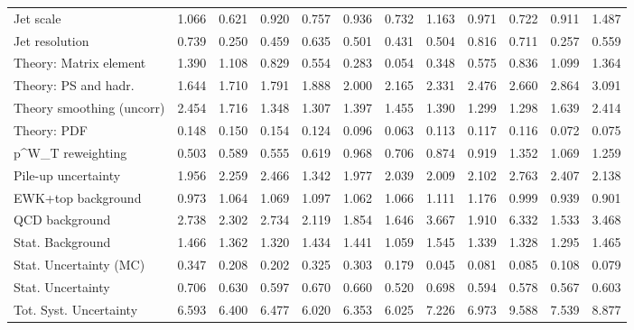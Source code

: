 \begin{tabular}{l|p{0.6cm}p{0.6cm}p{0.6cm}p{0.6cm}p{0.6cm}p{0.6cm}p{0.6cm}p{0.6cm}p{0.6cm}p{0.6cm}p{0.6cm}}
Jet scale                                & 1.066 & 0.621 & 0.920 & 0.757 & 0.936 & 0.732 & 1.163 & 0.971 & 0.722 & 0.911 & 1.487 \\
Jet resolution                           & 0.739 & 0.250 & 0.459 & 0.635 & 0.501 & 0.431 & 0.504 & 0.816 & 0.711 & 0.257 & 0.559 \\
Theory: Matrix element                   & 1.390 & 1.108 & 0.829 & 0.554 & 0.283 & 0.054 & 0.348 & 0.575 & 0.836 & 1.099 & 1.364 \\
Theory: PS and hadr.                     & 1.644 & 1.710 & 1.791 & 1.888 & 2.000 & 2.165 & 2.331 & 2.476 & 2.660 & 2.864 & 3.091 \\
Theory smoothing (uncorr)                & 2.454 & 1.716 & 1.348 & 1.307 & 1.397 & 1.455 & 1.390 & 1.299 & 1.298 & 1.639 & 2.414 \\
Theory: PDF                              & 0.148 & 0.150 & 0.154 & 0.124 & 0.096 & 0.063 & 0.113 & 0.117 & 0.116 & 0.072 & 0.075 \\
p^{W}_{T} reweighting                    & 0.503 & 0.589 & 0.555 & 0.619 & 0.968 & 0.706 & 0.874 & 0.919 & 1.352 & 1.069 & 1.259 \\
Pile-up uncertainty                      & 1.956 & 2.259 & 2.466 & 1.342 & 1.977 & 2.039 & 2.009 & 2.102 & 2.763 & 2.407 & 2.138 \\
EWK+top background                       & 0.973 & 1.064 & 1.069 & 1.097 & 1.062 & 1.066 & 1.111 & 1.176 & 0.999 & 0.939 & 0.901 \\
QCD background                           & 2.738 & 2.302 & 2.734 & 2.119 & 1.854 & 1.646 & 3.667 & 1.910 & 6.332 & 1.533 & 3.468 \\
Stat. Background                         & 1.466 & 1.362 & 1.320 & 1.434 & 1.441 & 1.059 & 1.545 & 1.339 & 1.328 & 1.295 & 1.465 \\
Stat. Uncertainty (MC)                   & 0.347 & 0.208 & 0.202 & 0.325 & 0.303 & 0.179 & 0.045 & 0.081 & 0.085 & 0.108 & 0.079 \\
\hline
Stat. Uncertainty                        & 0.706 & 0.630 & 0.597 & 0.670 & 0.660 & 0.520 & 0.698 & 0.594 & 0.578 & 0.567 & 0.603 \\
\hline
Tot. Syst. Uncertainty                   & 6.593 & 6.400 & 6.477 & 6.020 & 6.353 & 6.025 & 7.226 & 6.973 & 9.588 & 7.539 & 8.877 \\
\hline
\end{tabular}

